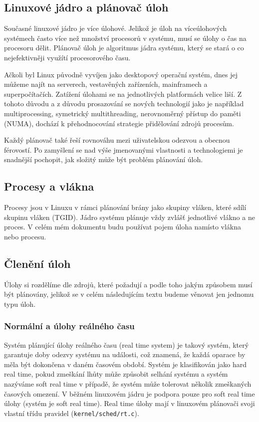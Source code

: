 \documentclass[
  master=true,
  font=sans,
  printversion=false,
  joinlists=true,
  figures=true,
  tables=true,
  sourcecodes=false,
  theorems=false,
  bibencoding=utf8,
  language=czech,
  encoding=utf8,
  field=ainfk,
  biblatex,
  glossaries,
  index
]{kidiplom}
\begin{document}
\subsection{Linuxové jádro a plánovač úloh}

Současné linuxové jádro je více úlohové. Jelikož je úloh na víceúlohových systémech často více než množství procesorů v systému, musí se úlohy o čas na procesoru dělit.
Plánovač úloh je algoritmus jádra systému, který se stará o co nejefektivněji využítí procesorového času.

Ačkoli byl Linux původně vyvíjen jako desktopový operační systém, dnes jej můžeme najít na serverech, vestavěných zařízeních, mainframech a superpočítačích. Zatížení úlohami se na jednotlivých platformách velice liší. Z tohoto důvodu a z důvodu prosazování se nových technologií jako je například multiprocessing, symetrický multithreading, nerovnoměrný přístup do paměti (NUMA), dochází k přehodnocování strategie přidělování zdrojů procesům. 

Každý plánovač také řeší rovnováhu mezi uživatelskou odezvou a obecnou férovostí. Po zamyšlení se nad výše jmenovanými vlastnosti a technologiemi je snadnější pochopit, jak složitý může být problém plánování úloh. 
\subsection{Procesy a vlákna}
Procesy jsou v Linuxu v rámci plánování brány jako skupiny vláken, které sdílí skupinu vláken (TGID). Jádro systému plánuje vždy zvlášť jednotlivé vlákno a ne proces. V celém mém dokumentu budu používat pojem úloha namísto vlákna nebo procesu.

\subsection{Členění úloh}
Úlohy si rozdělíme dle zdrojů, které požadují a podle toho jakým způsobem musí být plánovány, jelikož se v celém 
následujícím textu budeme věnovat jen jednomu typu úloh.

\subsubsection{Normální a úlohy reálného času}

Systém plánující úlohy reálného času (real time system) je takový systém, který garantuje doby odezvy systému na události, což znamená, že každá oparace by měla být dokončena v daném časovém období. Systém je klasifikován jako hard real time, pokud zmeškání lhůty může způsobit selhání systému a systém nazýváme soft real time v případě, že systém může tolerovat několik zmeškaných časových omezení. V běžném linuxovém jádru je podpora pouze pro soft real time úlohy (systém je soft real time). Real time úlohy mají v linuxovém plánovači svoji vlastní třídu pravidel (\verb#kernel/sched/rt.c#).
\end{document}
